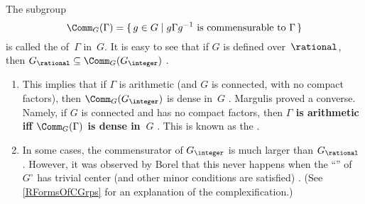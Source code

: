  \begin{rem} \label{GQComm}
The subgroup 
	$$\Comm_G(\Gamma) = \{\, g \in G \mid \text{$g \Gamma g^{-1}$ is commensurable to~$\Gamma$} \,\} $$
is called the  of~$\Gamma$ in~$G$. It is easy to see that if $G$ is defined over~$\rational$, 
then $G_{\rational} \subseteq \Comm_G(G_\integer)$
. 
\begin{enumerate}

\item \label{GQComm-criterion}
This implies that if $\Gamma$ is arithmetic (and $G$ is connected, with no compact factors), then $\Comm_G(G_{\integer})$ is dense in~$G$ .
Margulis proved a converse. Namely, if $G$ is connected and has no compact factors, then
{\bf{} $\Gamma$ is arithmetic iff\/ $\Comm_G(\Gamma)$ is dense in~$G$}
.
This is known as the .

\item \label{GQComm-bigger}
In some cases, the commensurator of $G_{\integer}$ is much larger than $G_{\rational}$ . However, it was observed by Borel that this never happens when the ``'' of~$G^\circ$ has trivial center (and other minor conditions are satisfied) .
(See \cref{RFormsOfCGrps} for an explanation of the complexification.)


\end{enumerate}
 \end{rem}


